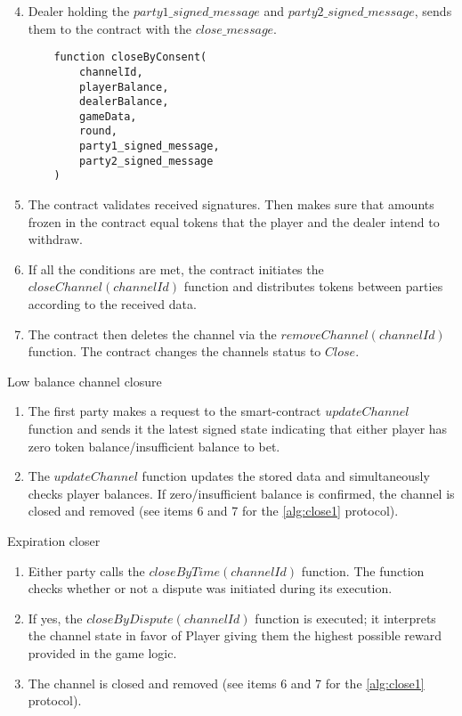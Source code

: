 \begin{algorithm}
\begin{enumerate}
\setcounter{enumi}{3}
	\item Dealer holding the $party1\_signed\_message$ and $party2\_signed\_message$, sends them to the contract with the $close\_message$. \label{deal_sig}
\begin{lstlisting}
    function closeByConsent(
        channelId,
        playerBalance,
        dealerBalance,
        gameData,
        round,
        party1_signed_message,
        party2_signed_message 
    )
\end{lstlisting}
	\item The contract validates received signatures. Then makes sure that amounts frozen in the contract equal tokens that the player and the dealer intend to withdraw.
	\item If all the conditions are met, the contract initiates the $closeChannel(channelId)$ function and distributes tokens between parties according to the received data.
	\item The contract then deletes the channel via the $removeChannel(channelId)$ function. The contract changes the channels status to $Close$.
\end{enumerate}
\end{algorithm}

\begin{algorithm}
\caption{Low balance channel closure} \label{alg:close2}
\begin{enumerate}
	\item The first party makes a request to the smart-contract $updateChannel$ function and sends it the latest signed state indicating that either player has zero token balance/insufficient balance to bet.
	\item The $updateChannel$ function updates the stored data and simultaneously checks player balances. If zero/insufficient balance is confirmed, the channel is closed and removed (see items 6 and 7 for the \autoref{alg:close1} protocol).
\end{enumerate}
\end{algorithm}

\begin{algorithm}[H]
\caption{Expiration closer} \label{alg:close3}
 \begin{enumerate}
	\item Either party calls the $closeByTime(channelId)$ function. The function checks whether or not a dispute was initiated during its execution.
	\item If yes, the $closeByDispute(channelId)$ function is executed; it interprets the channel state in favor of Player giving them the highest possible reward provided in the game logic. 
	\item The channel is closed and removed (see items 6 and 7 for the \autoref{alg:close1} protocol).
\end{enumerate}
\end{algorithm}

